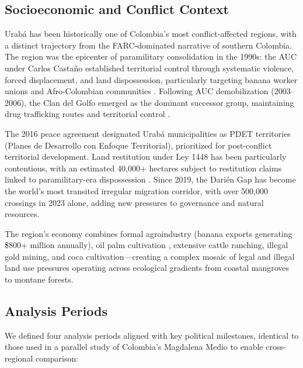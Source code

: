 \documentclass[12pt,a4paper]{article}
\begin{document}
\subsection{Socioeconomic and Conflict Context}

Urab\'{a} has been historically one of Colombia's most conflict-affected regions, with a distinct trajectory from the FARC-dominated narrative of southern Colombia. The region was the epicenter of paramilitary consolidation in the 1990s: the AUC under Carlos Casta\~{n}o established territorial control through systematic violence, forced displacement, and land dispossession, particularly targeting banana worker unions and Afro-Colombian communities \citep{GarciaDeLaTorre2011,Uribe2001,GutierrezSanin2014}. Following AUC demobilization (2003--2006), the Clan del Golfo emerged as the dominant successor group, maintaining drug trafficking routes and territorial control \citep{Grajales2011,Grajales2015}.

The 2016 peace agreement designated Urab\'{a} municipalities as PDET territories (Planes de Desarrollo con Enfoque Territorial), prioritized for post-conflict territorial development. Land restitution under Ley 1448 has been particularly contentious, with an estimated 40,000+ hectares subject to restitution claims linked to paramilitary-era dispossession \citep{SanchezGomez2020}. Since 2019, the Dari\'{e}n Gap has become the world's most transited irregular migration corridor, with over 500,000 crossings in 2023 alone, adding new pressures to governance and natural resources.

The region's economy combines formal agroindustry (banana exports generating \$800+ million annually), oil palm cultivation \citep{Castiblanco2013}, extensive cattle ranching, illegal gold mining, and coca cultivation---creating a complex mosaic of legal and illegal land use pressures operating across ecological gradients from coastal mangroves to montane forests.

\subsection{Analysis Periods}

We defined four analysis periods aligned with key political milestones, identical to those used in a parallel study of Colombia's Magdalena Medio to enable cross-regional comparison:
\end{document}
